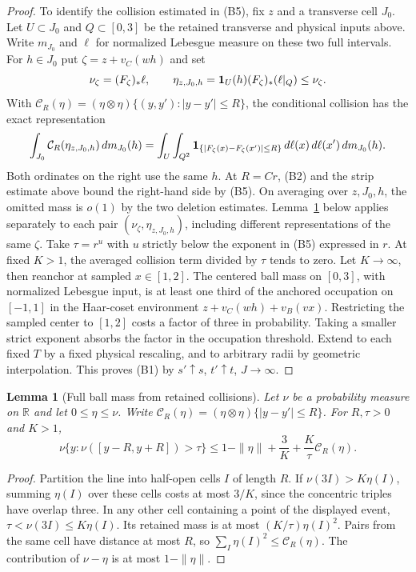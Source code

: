 \documentclass[11pt,a4paper]{article}
\newtheorem{lemma}[theorem]{Lemma}
\begin{document}
\begin{proof}
To identify the collision estimated in (B5), fix $z$ and a transverse
cell $J_0$. Let $U\subset J_0$ and $Q\subset[0,3]$ be the retained
transverse and physical inputs above. Write $m_{J_0}$ and $\ell$ for
normalized Lebesgue measure on these two full intervals. For
$h\in J_0$ put $\zeta=z+v_C(wh)$ and set
\[
 \nu_\zeta=(F_\zeta)_*\ell,\qquad
 \eta_{z,J_0,h}={\bf1}_U(h)(F_\zeta)_*(\ell|_Q)\le\nu_\zeta .
\]
With $\mathcal C_R(\eta)=(\eta\otimes\eta)\{(y,y'):|y-y'|\le R\}$,
the conditional collision has the exact representation
\[
 \int_{J_0}\mathcal C_R(\eta_{z,J_0,h})\,dm_{J_0}(h)
 =\int_U\int_{Q^2}
 {\bf1}_{\{|F_\zeta(x)-F_\zeta(x')|\le R\}}\,
 d\ell(x)\,d\ell(x')\,dm_{J_0}(h).
\]
Both ordinates on the right use the same $h$. At $R=Cr$, (B2) and
the strip estimate above bound the right-hand side by (B5).
On averaging over $z,J_0,h$, the omitted mass is $o(1)$ by the two
deletion estimates. Lemma~\ref{lem:full-ball} below applies separately
to each pair $(\nu_\zeta,\eta_{z,J_0,h})$, including different
representations of the same $\zeta$. Take $\tau=r^u$ with $u$ strictly
below the exponent in (B5) expressed in $r$. At fixed $K>1$, the
averaged collision term divided by $\tau$ tends to zero. Let $K\to\infty$,
then reanchor at sampled $x\in[1,2]$. The centered ball mass on
$[0,3]$, with normalized Lebesgue input, is at least one third of the
anchored occupation on $[-1,1]$ in the Haar-coset environment
$z+v_C(wh)+v_B(vx)$. Restricting the sampled center to $[1,2]$
costs a factor of three in probability. Taking a smaller strict
exponent absorbs the factor in the occupation threshold.
Extend to each fixed $T$ by a fixed physical
rescaling, and to arbitrary radii by geometric interpolation. This
proves (B1) by $s'\uparrow s$, $t'\uparrow t$, $J\to\infty$.

\end{proof}

\begin{lemma}[Full ball mass from retained collisions]\label{lem:full-ball}
Let $\nu$ be a probability measure on $\mathbb R$ and let $0\le\eta\le\nu$.
Write $\mathcal C_R(\eta)=(\eta\otimes\eta)\{|y-y'|\le R\}$.
For $R,\tau>0$ and $K>1$,
\[
 \nu\{y:\nu([y-R,y+R])>\tau\}
 \le 1-\|\eta\|+\frac{3}{K}+\frac{K}{\tau}\mathcal C_R(\eta).
\]
\end{lemma}
\begin{proof}
Partition the line into half-open cells $I$ of length $R$. If
$\nu(3I)>K\eta(I)$, summing $\eta(I)$ over these cells costs at most
$3/K$, since the concentric triples have overlap three. In any other
cell containing a point of the displayed event,
$\tau<\nu(3I)\le K\eta(I)$. Its retained mass is at most
$(K/\tau)\eta(I)^2$. Pairs from the same cell have distance at most
$R$, so $\sum_I\eta(I)^2\le\mathcal C_R(\eta)$. The contribution of
$\nu-\eta$ is at most $1-\|\eta\|$.
\end{proof}
\end{document}
